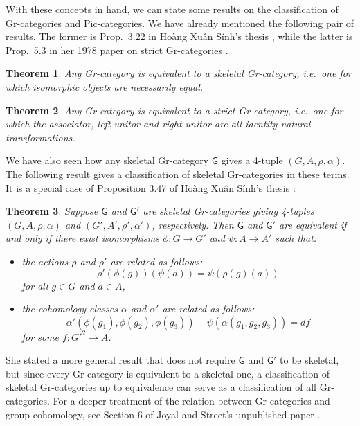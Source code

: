 \documentclass[reqno,12pt]{amsart}
\newcommand{\maps}{\colon}    %
\newcommand{\G}{{\mathsf{G}}}   %
\newtheorem{thm}{Theorem}
\theoremstyle{definition}
\begin{document}
With these concepts in hand, we can state some results on the classification of Gr-categories and Pic-categories.   We have already mentioned the following pair of results.  The former is Prop.\ 3.22 in Ho\`ang Xu\^an S\'inh's thesis \cite{H73}, while the latter is Prop.\ 5.3 in her 1978 paper on strict Gr-categories \cite{H78}.

\begin{thm}
\label{thm:Gr1}
Any Gr-category is equivalent to a skeletal Gr-category, i.e.\ one for which
isomorphic objects are necessarily equal.
\end{thm}

\begin{thm}
\label{thm:Gr3}
Any Gr-category is equivalent to a strict Gr-category, i.e.\ one for which the associator, left unitor and right unitor are all identity natural transformations.
\end{thm}

We have also seen how any skeletal Gr-category $\G$ gives a 4-tuple $(G,A,\rho,\alpha)$.  The following result gives a classification of skeletal Gr-categories in these terms.  It is a special case of Proposition 3.47 of Ho\`ang Xu\^an S\'inh's thesis \cite{H73}:

\begin{thm}
\label{thm:Gr2}
Suppose $\G$ and $\G'$ are skeletal Gr-categories giving 4-tuples $(G,A,\rho,\alpha)$ and $(G',A',\rho',\alpha')$, respectively.  Then $\G$ and $\G'$ are equivalent if and only if there exist isomorphisms $\phi \maps G \to G'$ and $\psi \maps A \to A'$ such that:
\begin{itemize}
\item
the actions $\rho$ and $\rho'$ are related as follows:
\[   \rho'(\phi(g))(\psi(a)) = \psi(\rho(g)(a)) \]
for all $g \in G$ and $a \in A$,
\item the cohomology classes $\alpha$ and $\alpha'$ are related as follows:
\[   \alpha'(\phi(g_1),\phi(g_2),\phi(g_3)) - \psi(\alpha(g_1,g_2,g_3)) = df \]
for some $f \maps G'^2 \to A$.
\end{itemize}
\end{thm}
\noindent
She stated a more general result that does not require $\G$ and $\G'$ to be skeletal, but since every Gr-category is equivalent to a skeletal one, a classification of skeletal Gr-categories up to equivalence can serve as a classification of all Gr-categories.   For a deeper treatment of the relation between Gr-categories and group cohomology, see Section 6 of Joyal and Street's unpublished paper \cite{JS86}.
\end{document}
